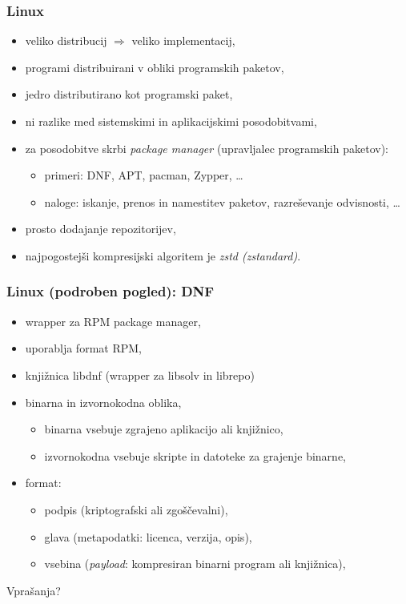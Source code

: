 \documentclass[aspectratio=169]{beamer}
\begin{document}
    \begin{frame}
        \frametitle{Linux}
        \begin{itemize}
            \item veliko distribucij \( \Rightarrow \) veliko implementacij,
            \item programi distribuirani v obliki programskih paketov,
            \item jedro distributirano kot programski paket,
            \item ni razlike med sistemskimi in aplikacijskimi posodobitvami,
            \item za posodobitve skrbi \emph{package manager} (upravljalec programskih paketov):
            \begin{itemize}
                \item primeri: DNF, APT, pacman, Zypper, \ldots
                \item naloge: iskanje, prenos in namestitev paketov, razreševanje odvisnosti, \ldots
            \end{itemize}
            \item prosto dodajanje repozitorijev,
            \item najpogostejši kompresijski algoritem je \emph{zstd (zstandard)}.
        \end{itemize}
    \end{frame}

    \begin{frame}
        \frametitle{Linux (podroben pogled): DNF}
        \begin{itemize}
            \item wrapper za RPM package manager,
            \item uporablja format RPM,
            \item knjižnica libdnf (wrapper za libsolv in librepo)
            \item binarna in izvornokodna oblika,
            \begin{itemize}
                \item binarna vsebuje zgrajeno aplikacijo ali knjižnico,
                \item izvornokodna vsebuje skripte in datoteke za grajenje binarne,
            \end{itemize}
            \item format:
            \begin{itemize}
                \item podpis (kriptografski ali zgoščevalni),
                \item glava (metapodatki: licenca, verzija, opis),
                \item vsebina (\emph{payload}: kompresiran binarni program ali knjižnica),
            \end{itemize}
        \end{itemize}
    \end{frame}

    \begin{frame}[plain,c]
       \begin{center}
            Vprašanja?
       \end{center}
    \end{frame}
\end{document}

